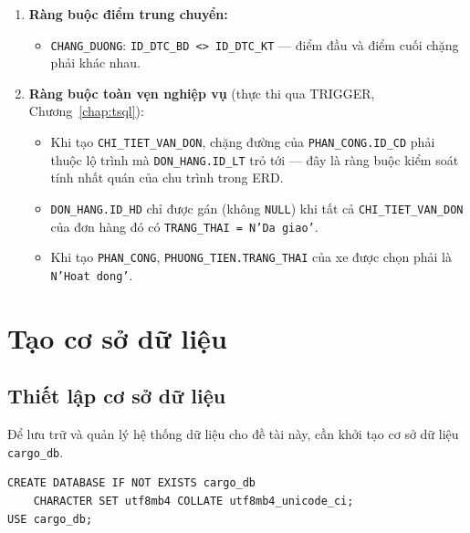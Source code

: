 \documentclass[11pt]{report}
\begin{document}
\begin{enumerate}
    \item \textbf{Ràng buộc điểm trung chuyển:}
    \begin{itemize}
        \item \texttt{CHANG\_DUONG}: \texttt{ID\_DTC\_BD <> ID\_DTC\_KT} --- điểm đầu và điểm cuối chặng phải khác nhau.
    \end{itemize}

    \item \textbf{Ràng buộc toàn vẹn nghiệp vụ} (thực thi qua TRIGGER, Chương~\ref{chap:tsql}):
    \begin{itemize}
        \item Khi tạo \texttt{CHI\_TIET\_VAN\_DON}, chặng đường của \texttt{PHAN\_CONG.ID\_CD} phải thuộc lộ trình mà \texttt{DON\_HANG.ID\_LT} trỏ tới --- đây là ràng buộc kiểm soát tính nhất quán của chu trình trong ERD.
        
        \item \texttt{DON\_HANG.ID\_HD} chỉ được gán (không \texttt{NULL}) khi tất cả \texttt{CHI\_TIET\_VAN\_DON} của đơn hàng đó có \texttt{TRANG\_THAI = N'Da giao'}.
        
        \item Khi tạo \texttt{PHAN\_CONG}, \texttt{PHUONG\_TIEN.TRANG\_THAI} của xe được chọn phải là \texttt{N'Hoat dong'}.
    \end{itemize}
\end{enumerate}


\section{Tạo cơ sở dữ liệu}
\label{sec:tao_csdl}

\subsection{Thiết lập cơ sở dữ liệu}
\label{subsec:thietlapcsdl}

Để lưu trữ và quản lý hệ thống dữ liệu cho đề tài này, cần khởi tạo cơ sở dữ liệu \texttt{cargo\_db}.

\begin{verbatim}
CREATE DATABASE IF NOT EXISTS cargo_db
    CHARACTER SET utf8mb4 COLLATE utf8mb4_unicode_ci;
USE cargo_db;
\end{verbatim}
\end{document}
